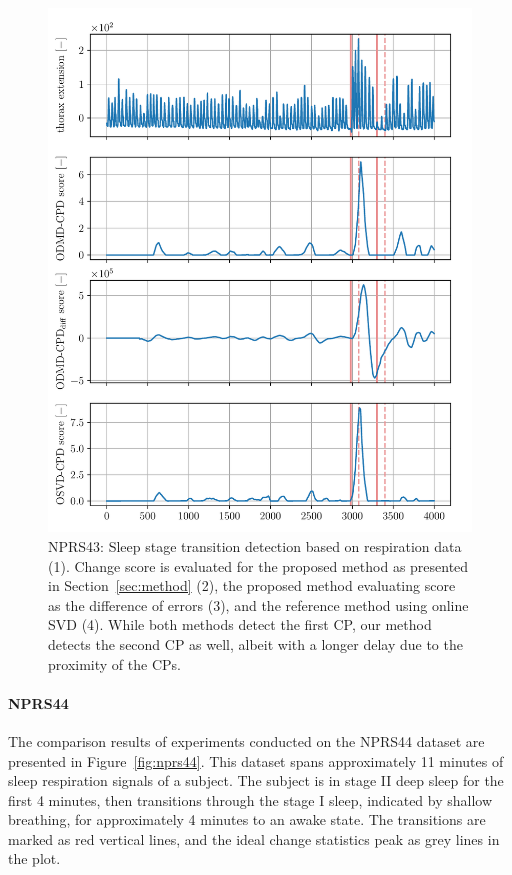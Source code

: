 \begin{figure}
	\centering
	\includegraphics[width=\linewidth]{figures/nprs43-chd_r2-roll_301-dmd_w1.0-h80.pdf}
	\caption{NPRS43: Sleep stage transition detection based on respiration data (1). Change score is evaluated for the proposed method as presented in Section~\ref{sec:method} (2), the proposed method evaluating score as the difference of errors (3), and the reference method using online SVD (4). While both methods detect the first CP, our method detects the second CP as well, albeit with a longer delay due to the proximity of the CPs.}\label{fig:nprs43}
\end{figure}

\paragraph{NPRS44}
The comparison results of experiments conducted on the NPRS44 dataset are presented in Figure~\ref{fig:nprs44}. This dataset spans approximately 11 minutes of sleep respiration signals of a subject. The subject is in stage II deep sleep for the first 4 minutes, then transitions through the stage I sleep, indicated by shallow breathing, for approximately 4 minutes to an awake state. The transitions are marked as red vertical lines, and the ideal change statistics peak as grey lines in the plot.

